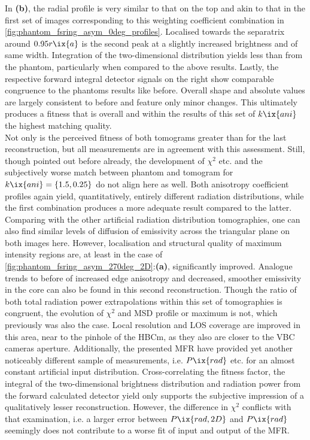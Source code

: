                 In \textbf{(b)}, the radial profile is very similar to that on the top and akin to that in the first set of images corresponding to this weighting coefficient combination in \cref{fig:phantom_fsring_asym_0deg_profiles}. Localised towards the separatrix around $0.95r\ix{a}$ is the second peak at a slightly increased brightness and of same width. Integration of the two-dimensional distribution yields less than from the phantom, particularly when compared to the above results. Lastly, the respective forward integral detector signals on the right show comparable congruence to the phantoms results like before. Overall shape and absolute values are largely consistent to before and feature only minor changes. This ultimately produces a fitness that is overall and within the results of this set of $k\ix{ani}$ the highest matching quality.\\%
                Not only is the perceived fitness of both tomograms greater than for the last reconstruction, but all measurements are in agreement with this assessment. Still, though pointed out before already, the development of $\chi^{2}$ etc. and the subjectively worse match between phantom and tomogram for $k\ix{ani}=\left\{1.5, 0.25\right\}$ do not align here as well. Both anisotropy coefficient profiles again yield, quantitatively, entirely different radiation distributions, while the first combination produces a more adequate result compared to the latter. Comparing with the other artificial radiation distribution tomographies, one can also find similar levels of diffusion of emissivity across the triangular plane on both images here. However, localisation and structural quality of maximum intensity regions are, at least in the case of \cref{fig:phantom_fsring_asym_270deg_2D}:\textbf{(a)}, significantly improved. Analogue trends to before of increased edge anisotropy and decreased, smoother emissivity in the core can also be found in this second reconstruction. Though the ratio of both total radiation power extrapolations within this set of tomographies is congruent, the evolution of $\chi^{2}$ and MSD profile or maximum is not, which previously was also the case. Local resolution and LOS coverage are improved in this area, near to the pinhole of the HBCm, as they also are closer to the VBC cameras aperture. Additionally, the presented MFR have provided yet another noticeably different sample of measurements, i.e. $P\ix{rad}$ etc. for an almost constant artificial input distribution. Cross-correlating the fitness factor, the integral of the two-dimensional brightness distribution and radiation power from the forward calculated detector yield only supports the subjective impression of a qualitatively lesser reconstruction. However, the difference in $\chi^{2}$ conflicts with that examination, i.e. a larger error between $P\ix{rad,2D}$ and $P\ix{rad}$ seemingly does not contribute to a worse fit of input and output of the MFR.\\%
